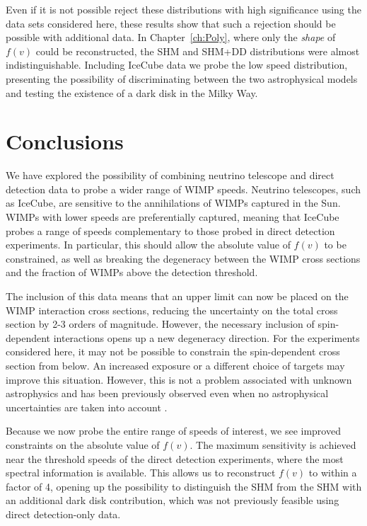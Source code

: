 Even if it is not possible reject these distributions with high significance using the data sets considered here, these results show that such a rejection should be possible with additional data. In Chapter~\ref{ch:Poly}, where only the \textit{shape} of $f(v)$ could be reconstructed, the SHM and SHM+DD distributions were almost indistinguishable. Including IceCube data we probe the low speed distribution, presenting the possibility of discriminating between the two astrophysical models and testing the existence of a dark disk in the Milky Way.



\section{Conclusions}

We have explored the possibility of combining neutrino telescope and direct detection data to probe a wider range of WIMP speeds. Neutrino telescopes, such as IceCube, are sensitive to the annihilations of WIMPs captured in the Sun. WIMPs with lower speeds are preferentially captured, meaning that IceCube probes a range of speeds complementary to those probed in direct detection experiments. In particular, this should allow the absolute value of $f(v)$ to be constrained, as well as breaking the degeneracy between the WIMP cross sections and the fraction of WIMPs above the detection threshold.

The inclusion of this data means that an upper limit can now be placed on the WIMP interaction cross sections, reducing the uncertainty on the total cross section by 2-3 orders of magnitude. However, the necessary inclusion of spin-dependent interactions opens up a new degeneracy direction. For the experiments considered here, it may not be possible to constrain the spin-dependent cross section from below. An increased exposure or a different choice of targets may improve this situation. However, this is not a problem associated with unknown astrophysics and has been previously observed even when no astrophysical uncertainties are taken into account \cite{Cerdeno:2013}.

Because we now probe the entire range of speeds of interest, we see improved constraints on the absolute value of $f(v)$. The maximum sensitivity is achieved near the threshold speeds of the direct detection experiments, where the most spectral information is available. This allows us to reconstruct $f(v)$ to within a factor of 4, opening up the possibility to distinguish the SHM from the SHM with an additional dark disk contribution, which was not previously feasible using direct detection-only data. 

